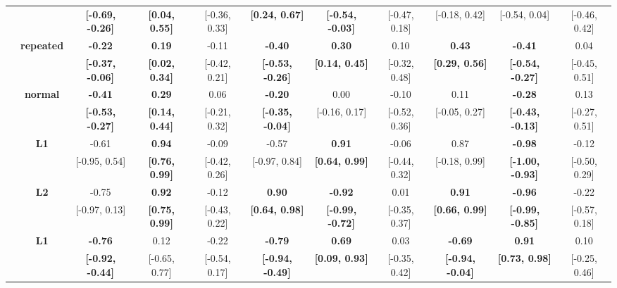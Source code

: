 \begin{table}[ht]
{{\begin{tabular}{@{}>{\centering\arraybackslash}m{0.9cm}@{}c ccccccccc@{}}
\\
 &  & \rule{0pt}{2.2ex} \textbf{[-0.69, -0.26]} & \textbf{[0.04, 0.55]} & [-0.36, 0.33] & \textbf{[0.24, 0.67]} & \textbf{[-0.54, -0.03]} & [-0.47, 0.18] & [-0.18, 0.42] & [-0.54, 0.04] & [-0.46, 0.42]
\\
\multirow{4}{*}{\centering\rotatebox[origin=c]{90}{\textbf{OneStop}}} & \multirow{2}{*}{\textbf{repeated}} & \rule{0pt}{2.2ex} \textbf{-0.22} & \textbf{0.19} & -0.11 & \textbf{-0.40} & \textbf{0.30} & 0.10 & \textbf{0.43} & \textbf{-0.41} & 0.04
\\
 &  & \rule{0pt}{2.2ex} \textbf{[-0.37, -0.06]} & \textbf{[0.02, 0.34]} & [-0.42, 0.21] & \textbf{[-0.53, -0.26]} & \textbf{[0.14, 0.45]} & [-0.32, 0.48] & \textbf{[0.29, 0.56]} & \textbf{[-0.54, -0.27]} & [-0.45, 0.51]
\\
\addlinespace[6pt]
 & \multirow{2}{*}{\textbf{normal}} & \rule{0pt}{2.2ex} \textbf{-0.41} & \textbf{0.29} & 0.06 & \textbf{-0.20} & 0.00 & -0.10 & 0.11 & \textbf{-0.28} & 0.13
\\
 &  & \rule{0pt}{2.2ex} \textbf{[-0.53, -0.27]} & \textbf{[0.14, 0.44]} & [-0.21, 0.32] & \textbf{[-0.35, -0.04]} & [-0.16, 0.17] & [-0.52, 0.36] & [-0.05, 0.27] & \textbf{[-0.43, -0.13]} & [-0.27, 0.51]
\\
\multirow{4}{*}{\centering\rotatebox[origin=c]{90}{\textbf{GECO-NL}}} & \multirow{2}{*}{\textbf{L1}} & \rule{0pt}{2.2ex} -0.61 & \textbf{0.94} & -0.09 & -0.57 & \textbf{0.91} & -0.06 & 0.87 & \textbf{-0.98} & -0.12
\\
 &  & \rule{0pt}{2.2ex} [-0.95, 0.54] & \textbf{[0.76, 0.99]} & [-0.42, 0.26] & [-0.97, 0.84] & \textbf{[0.64, 0.99]} & [-0.44, 0.32] & [-0.18, 0.99] & \textbf{[-1.00, -0.93]} & [-0.50, 0.29]
\\
\addlinespace[6pt]
 & \multirow{2}{*}{\textbf{L2}} & \rule{0pt}{2.2ex} -0.75 & \textbf{0.92} & -0.12 & \textbf{0.90} & \textbf{-0.92} & 0.01 & \textbf{0.91} & \textbf{-0.96} & -0.22
\\
 &  & \rule{0pt}{2.2ex} [-0.97, 0.13] & \textbf{[0.75, 0.99]} & [-0.43, 0.22] & \textbf{[0.64, 0.98]} & \textbf{[-0.99, -0.72]} & [-0.35, 0.37] & \textbf{[0.66, 0.99]} & \textbf{[-0.99, -0.85]} & [-0.57, 0.18]
\\
\multirow{4}{*}{\centering\rotatebox[origin=c]{90}{\textbf{GECO-ZH}}} & \multirow{2}{*}{\textbf{L1}} & \rule{0pt}{2.2ex} \textbf{-0.76} & 0.12 & -0.22 & \textbf{-0.79} & \textbf{0.69} & 0.03 & \textbf{-0.69} & \textbf{0.91} & 0.10
\\
 &  & \rule{0pt}{2.2ex} \textbf{[-0.92, -0.44]} & [-0.65, 0.77] & [-0.54, 0.17] & \textbf{[-0.94, -0.49]} & \textbf{[0.09, 0.93]} & [-0.35, 0.42] & \textbf{[-0.94, -0.04]} & \textbf{[0.73, 0.98]} & [-0.25, 0.46]

\end{tabular}}}
\end{table}
